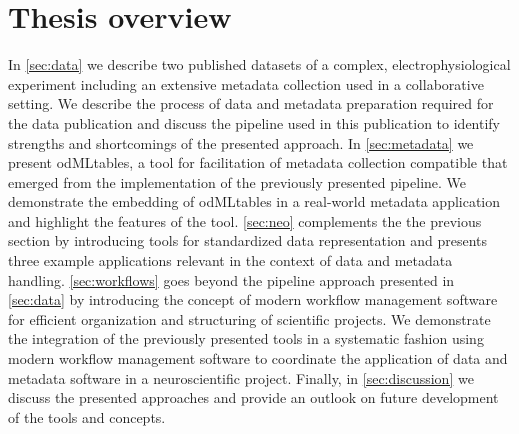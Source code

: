 \section{Thesis overview}
In \cref{sec:data} we describe two published datasets of a complex, electrophysiological experiment including an extensive metadata collection used in a collaborative setting. We describe the process of data and metadata preparation required for the data publication and discuss the pipeline used in this publication to identify strengths and shortcomings of the presented approach. In \cref{sec:metadata} we present odMLtables, a tool for facilitation of metadata collection compatible that emerged from the implementation of the previously presented pipeline. We demonstrate the embedding of odMLtables in a real-world metadata application and highlight the  features of the tool. \cref{sec:neo} complements the the previous section by introducing tools for standardized data representation and presents three example applications relevant in the context of data and metadata handling. \cref{sec:workflows} goes beyond the pipeline approach presented in \cref{sec:data} by introducing the concept of modern workflow management software for efficient organization and structuring of scientific projects. We demonstrate the integration of the previously presented tools in a systematic fashion using modern workflow management software to coordinate the application of data and metadata software in a neuroscientific project. Finally, in \cref{sec:discussion} we discuss the presented approaches and provide an outlook on future development of the tools and concepts.












































